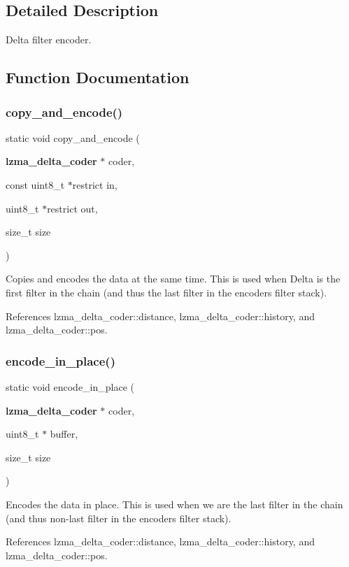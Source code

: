 \subsection{Detailed Description}
Delta filter encoder. 



\subsection{Function Documentation}
\mbox{\label{delta__encoder_8c_af1b67fdab085152a5df9a2099c80f4d2}} 
\subsubsection{copy\+\_\+and\+\_\+encode()}
{\footnotesize\ttfamily static void copy\+\_\+and\+\_\+encode (\begin{DoxyParamCaption}\item[{\textbf{ lzma\+\_\+delta\+\_\+coder} $\ast$}]{coder,  }\item[{const uint8\+\_\+t $\ast$restrict}]{in,  }\item[{uint8\+\_\+t $\ast$restrict}]{out,  }\item[{size\+\_\+t}]{size }\end{DoxyParamCaption})\hspace{0.3cm}{\ttfamily [static]}}

Copies and encodes the data at the same time. This is used when Delta is the first filter in the chain (and thus the last filter in the encoder\textquotesingle{}s filter stack). 

References lzma\+\_\+delta\+\_\+coder\+::distance, lzma\+\_\+delta\+\_\+coder\+::history, and lzma\+\_\+delta\+\_\+coder\+::pos.

\mbox{\label{delta__encoder_8c_a86159f5000d67ae70a39860ec7295fb4}} 
\subsubsection{encode\+\_\+in\+\_\+place()}
{\footnotesize\ttfamily static void encode\+\_\+in\+\_\+place (\begin{DoxyParamCaption}\item[{\textbf{ lzma\+\_\+delta\+\_\+coder} $\ast$}]{coder,  }\item[{uint8\+\_\+t $\ast$}]{buffer,  }\item[{size\+\_\+t}]{size }\end{DoxyParamCaption})\hspace{0.3cm}{\ttfamily [static]}}

Encodes the data in place. This is used when we are the last filter in the chain (and thus non-\/last filter in the encoder\textquotesingle{}s filter stack). 

References lzma\+\_\+delta\+\_\+coder\+::distance, lzma\+\_\+delta\+\_\+coder\+::history, and lzma\+\_\+delta\+\_\+coder\+::pos.

